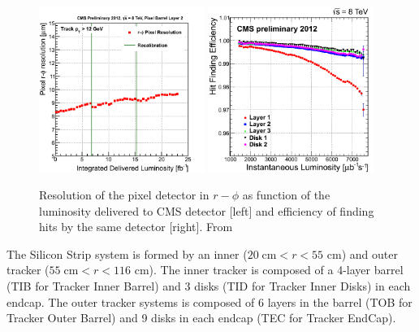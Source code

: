 \begin{figure}[!Hhtbp]
  \begin{center}
    \includegraphics[width=0.48\textwidth]{figs/PXB2_residuals.png}
    \includegraphics[width=0.48\textwidth]{figs/HitEff_vs_InstLumi.png}
    \caption{Resolution of the pixel detector in $r-\phi$ as function of the luminosity delivered to CMS detector [left] and efficiency of finding hits by the same detector [right]. From~\cite{Brochet:1956723}}
    \label{fig:pixelresolution}
  \end{center}
\end{figure}

The Silicon Strip system is formed by an inner ($20\;\text{cm} < r < 55$ cm) and outer tracker ($55\;\text{cm} < r < 116$ cm). The inner tracker is composed of a 4-layer barrel (TIB for Tracker Inner Barrel) and 3 disks (TID for Tracker Inner Disks) in each endcap. The outer tracker systems is composed of 6 layers in the barrel (TOB for Tracker Outer Barrel) and 9 disks in each endcap (TEC for Tracker EndCap).


